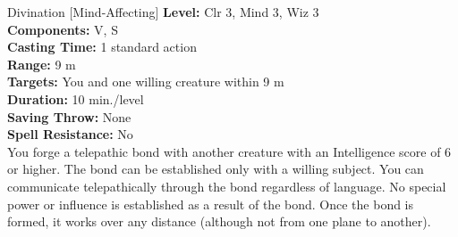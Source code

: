 {Divination [Mind-Affecting]}
{
	\textbf{Level:} Clr 3, Mind 3, Wiz 3\\
	\textbf{Components:} V, S\\
	\textbf{Casting Time:} 1 standard action\\
	\textbf{Range:} 9 m\\
	\textbf{Targets:} You and one willing creature within 9 m\\
	\textbf{Duration:} 10 min./level\\
	\textbf{Saving Throw:} None\\
	\textbf{Spell Resistance:} No\\
}
{
	You forge a telepathic bond with another creature with an Intelligence score of 6 or higher. The bond can be established only with a willing subject. You can communicate telepathically through the bond regardless of language. No special power or influence is established as a result of the bond. Once the bond is formed, it works over any distance (although not from one plane to another).
}